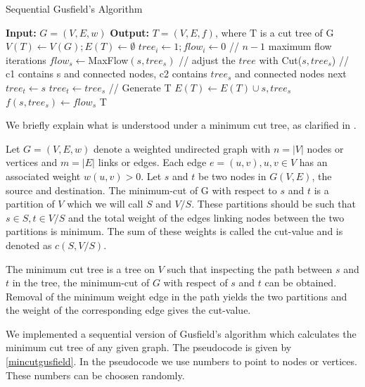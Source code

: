 \begin{algorithm}
\caption{Sequential Gusfield's Algorithm}
\label{mincutgusfield}
\begin{algorithmic}
\STATE \textbf{Input:} $G = (V,E,w)$ 
\STATE \textbf{Output:} $T = (V,E,f)$, where T is a cut tree of G
\STATE $V(T) \leftarrow V(G); E(T) \leftarrow \emptyset$
\STATE $tree_i \leftarrow 1; flow_i \leftarrow 0$
\ENDFOR
\STATE // $n - 1$ maximum flow iterations
\STATE $flow_s \leftarrow $MaxFlow$(s, tree_s)$
\STATE // adjust the $tree$ with Cut($s,tree_s$)
\STATE // c1 contains s and connected nodes, c2 contains $tree_s$ and connected nodes
			\STATE next
			\STATE $tree_t \leftarrow s$
			\STATE $tree_t \leftarrow tree_s$
		\ENDIF
	\ENDFOR
\ENDFOR
\STATE // Generate T
\STATE $E(T) \leftarrow E(T) \cup {s, tree_s}$
\STATE $f({s,tree_s}) \leftarrow flow_s$
\ENDFOR
\RETURN T
\end{algorithmic}
\end{algorithm}


We briefly explain what is understood under a minimum cut tree, as clarified in \cite{saha2006dynamic}. 

Let $G = (V,E,w)$ denote a weighted undirected graph with $n = |V|$ nodes or vertices and $m = |E|$ links or edges. Each edge $e = (u, v), u,v \in V$ has an associated weight $w(u,v) > 0$. Let $s$ and $t$ be two nodes in $G(V,E)$, the source and destination. The minimum-cut of G with respect to $s$ and $t$ is a partition of $V$ which we will call $S$ and $V/S$. These partitions should be such that $s \in S, t \in V/S$ and the total weight of the edges linking nodes between the two partitions is minimum. The sum of these weights is called the cut-value and is denoted as $c(S,V/S)$. 

The minimum cut tree is a tree on $V$ such that inspecting the path between $s$ and $t$ in the tree, the minimum-cut of $G$ with respect of $s$ and $t$ can be obtained. Removal of the minimum weight edge in the path yields the two partitions and the weight of the corresponding edge gives the cut-value.

We implemented a sequential version of Gusfield's algorithm which calculates the minimum cut tree of any given graph. The pseudocode is given by \autoref{mincutgusfield}. In the pseudocode we use numbers to point to nodes or vertices. These numbers can be choosen randomly.

